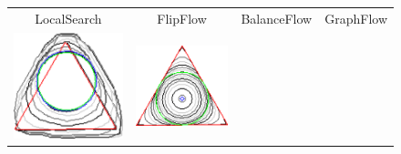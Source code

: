 \begin{figure}
\begin{tabular}{cccc}
LocalSearch & FlipFlow & BalanceFlow & GraphFlow\\[1em]
\includegraphics[scale=0.15]{figures/chapter9/free-elastica/localsearch/triangle/len_pen-0.01/radius-7/summary.pdf} & 
\includegraphics[scale=0.15]{figures/chapter9/free-elastica/flipflow/triangle/len_pen-0.01/radius-7/summary.pdf} &

\end{tabular}
\end{figure}
